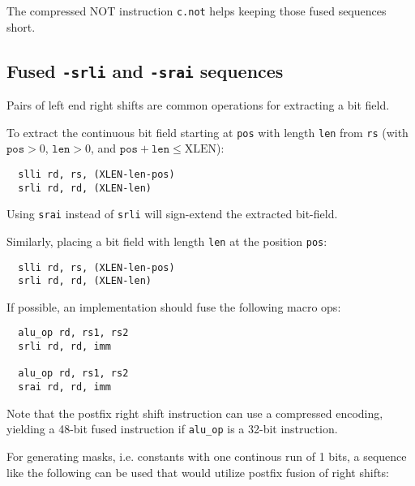 The compressed NOT instruction {\tt c.not} helps keeping those fused sequences short.


\subsection{Fused {\tt *-srli} and {\tt *-srai} sequences}

Pairs of left end right shifts are common operations for extracting a bit field.

To extract the continuous bit field starting at {\tt pos} with length {\tt len}
from {\tt rs} (with $\texttt{pos}>0$, $\texttt{len}>0$, and
$\texttt{pos}+\texttt{len}\le\textrm{XLEN}$):

\begin{minipage}{\linewidth}
\begin{verbatim}
  slli rd, rs, (XLEN-len-pos)
  srli rd, rd, (XLEN-len)
\end{verbatim}
\end{minipage}

Using \texttt{srai} instead of \texttt{srli} will sign-extend the extracted bit-field.

Similarly, placing a bit field with length {\tt len} at the position {\tt pos}:

\begin{minipage}{\linewidth}
\begin{verbatim}
  slli rd, rs, (XLEN-len-pos)
  srli rd, rd, (XLEN-len)
\end{verbatim}
\end{minipage}

If possible, an implementation should fuse the following macro ops:

\begin{minipage}{\linewidth}
\begin{verbatim}
  alu_op rd, rs1, rs2
  srli rd, rd, imm

  alu_op rd, rs1, rs2
  srai rd, rd, imm
\end{verbatim}
\end{minipage}

Note that the postfix right shift instruction can use a compressed encoding,
yielding a 48-bit fused instruction if {\tt alu\_op} is a 32-bit instruction.

For generating masks, i.e. constants with one continous run of 1 bits, a sequence
like the following can be used that would utilize postfix fusion of right shifts:

